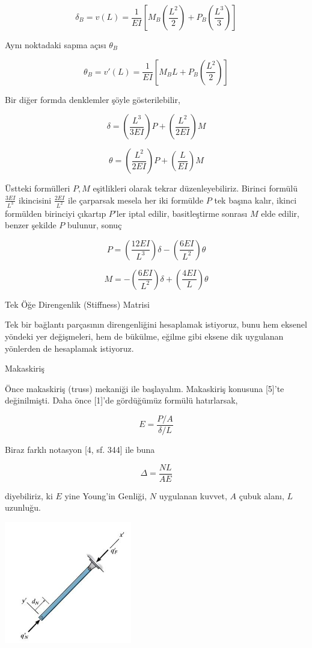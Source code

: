 \documentclass[12pt,fleqn]{article}\usepackage{../../common}
\begin{document}
$$
\delta_B = v(L) =
\frac{1}{EI} \left[
M_B \left( \frac{L^2}{2}  \right) +
P_B \left( \frac{L^3}{3}  \right)
\right]
$$

Aynı noktadaki sapma açısı $\theta_B$

$$
\theta_B = v'(L) =
\frac{1}{EI} \left[
M_B L + P_B \left( \frac{L^2}{2} \right) 
\right]
$$

Bir diğer formda denklemler şöyle gösterilebilir,

$$
\delta = \left( \frac{L^3}{3EI} \right) P +
\left( \frac{L^2}{2EI} \right) M
$$

$$
\theta = \left( \frac{L^2}{2EI} \right) P +
\left( \frac{L}{EI} \right) M
$$

Üstteki formülleri $P,M$ eşitlikleri olarak tekrar düzenleyebiliriz.
Birinci formülü $\frac{3EI}{L^3}$ ikincisini $\frac{2EI}{L^2}$ ile
çarparsak mesela her iki formülde $P$ tek başına kalır, ikinci formülden
birinciyi çıkartıp $P$'ler iptal edilir, basitleştirme sonrası $M$ elde
edilir, benzer şekilde $P$ bulunur, sonuç

$$
P = \left( \frac{12EI}{L^3}  \right) \delta -
\left(  \frac{6EI}{L^2} \right) \theta
$$

$$
M = - \left( \frac{6 EI}{L^2}  \right) \delta +
\left( \frac{4 EI}{L}  \right) \theta
$$

Tek Öğe Direngenlik (Stiffness) Matrisi

Tek bir bağlantı parçasının direngenliğini hesaplamak istiyoruz, bunu hem
eksenel yöndeki yer değişmeleri, hem de bükülme, eğilme gibi eksene dik
uygulanan yönlerden de hesaplamak istiyoruz.

Makaskiriş

Önce makaskiriş (truss) mekaniği ile başlayalım. Makaskiriş konusuna [5]'te
değinilmişti. Daha önce [1]'de gördüğümüz formülü hatırlarsak,

$$
E = \frac{P/A}{\delta / L}
$$

Biraz farklı notasyon [4, sf. 344] ile buna

$$
\Delta = \frac{NL}{AE}
$$

diyebiliriz, ki $E$ yine Young'in Genliği, $N$ uygulanan kuvvet, $A$ çubuk
alanı, $L$ uzunluğu.

\includegraphics[width=15em]{phy_020_strs_05_06.jpg}
\end{document}
